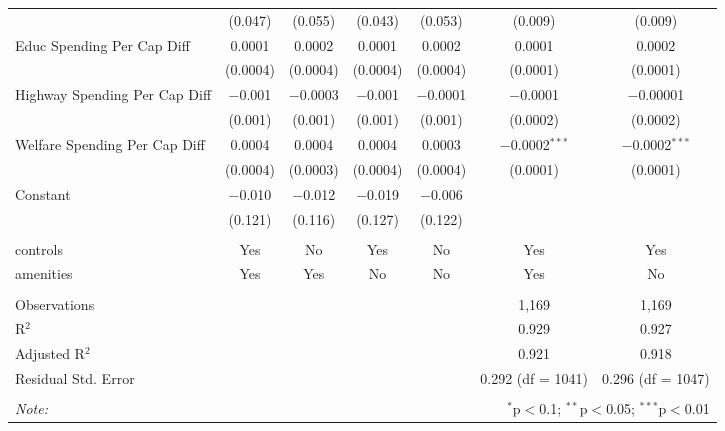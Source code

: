 \begin{table}[!htbp]
\begin{tabular}{@{\extracolsep{5pt}}lcccccc}
  & (0.047) & (0.055) & (0.043) & (0.053) & (0.009) & (0.009) \\ 
  Educ Spending Per Cap Diff & 0.0001 & 0.0002 & 0.0001 & 0.0002 & 0.0001 & 0.0002 \\ 
  & (0.0004) & (0.0004) & (0.0004) & (0.0004) & (0.0001) & (0.0001) \\ 
  Highway Spending Per Cap Diff & $-$0.001 & $-$0.0003 & $-$0.001 & $-$0.0001 & $-$0.0001 & $-$0.00001 \\ 
  & (0.001) & (0.001) & (0.001) & (0.001) & (0.0002) & (0.0002) \\ 
  Welfare Spending Per Cap Diff & 0.0004 & 0.0004 & 0.0004 & 0.0003 & $-$0.0002$^{***}$ & $-$0.0002$^{***}$ \\ 
  & (0.0004) & (0.0003) & (0.0004) & (0.0004) & (0.0001) & (0.0001) \\ 
  Constant & $-$0.010 & $-$0.012 & $-$0.019 & $-$0.006 &  &  \\ 
  & (0.121) & (0.116) & (0.127) & (0.122) &  &  \\ 
 \hline \\[-1.8ex] 
controls & Yes & No & Yes & No & Yes & Yes \\ 
amenities & Yes & Yes & No & No & Yes & No \\ 
\hline \\[-1.8ex] 
Observations &  &  &  &  & 1,169 & 1,169 \\ 
R$^{2}$ &  &  &  &  & 0.929 & 0.927 \\ 
Adjusted R$^{2}$ &  &  &  &  & 0.921 & 0.918 \\ 
Residual Std. Error &  &  &  &  & 0.292 (df = 1041) & 0.296 (df = 1047) \\ 
\hline 
\hline \\[-1.8ex] 
\textit{Note:}  & \multicolumn{6}{r}{$^{*}$p$<$0.1; $^{**}$p$<$0.05; $^{***}$p$<$0.01} \\ 
\end{tabular} 
\end{table} 
